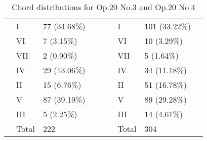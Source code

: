 \begin{table}[]
{\begin{tabular}{|l|l|l|l|l|l|l|l|l|}
 & I & 77 (34.68\%) &  &  &  & I & 101 (33.22\%) &  \\ \cline{2-3} \cline{7-8}
 & VI & 7 (3.15\%) &  &  &  & VI & 10 (3.29\%) &  \\ \cline{2-3} \cline{7-8}
 & VII & 2 (0.90\%) &  &  &  & VII & 5 (1.64\%) &  \\ \cline{2-3} \cline{7-8}
 & IV & 29 (13.06\%) &  &  &  & IV & 34 (11.18\%) &  \\ \cline{2-3} \cline{7-8}
 & II & 15 (6.76\%) &  &  &  & II & 51 (16.78\%) &  \\ \cline{2-3} \cline{7-8}
 & V & 87 (39.19\%) &  &  &  & V & 89 (29.28\%) &  \\ \cline{2-3} \cline{7-8}
 & III & 5 (2.25\%) &  &  &  & III & 14 (4.61\%) &  \\ \cline{2-3} \cline{7-8}
 & Total & 222 &  &  &  & Total & 304 &  \\ \cline{1-4} \cline{6-9}
\end{tabular}
}
\caption{Chord distributions for Op.20 No.3 and Op.20 No.4}
\label{table:chord_distribs2}
\end{table}

